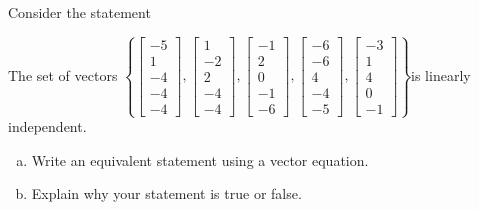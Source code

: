 
\begin{exerciseStatement}


Consider the statement 
\begin{center}\begin{minipage}{0.8\textwidth}
 The set of vectors \( \left\{ \left[\begin{array}{c}
-5 \\
1 \\
-4 \\
-4 \\
-4
\end{array}\right] , \left[\begin{array}{c}
1 \\
-2 \\
2 \\
-4 \\
-4
\end{array}\right] , \left[\begin{array}{c}
-1 \\
2 \\
0 \\
-1 \\
-6
\end{array}\right] , \left[\begin{array}{c}
-6 \\
-6 \\
4 \\
-4 \\
-5
\end{array}\right] , \left[\begin{array}{c}
-3 \\
1 \\
4 \\
0 \\
-1
\end{array}\right] \right\} \)is linearly independent.
\end{minipage}\end{center}
    


\begin{enumerate}[(a)]
\item  Write an equivalent statement using a vector equation.
\item  Explain why your statement is true or false.
\end{enumerate}
    
\end{exerciseStatement}
    
